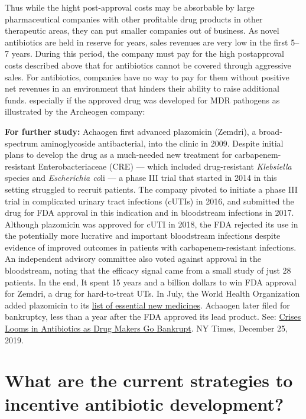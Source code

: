 \documentclass[
]{book}
\begin{document}
Thus while the hight post-approval costs may be absorbable by large pharmaceutical companies with other profitable drug products in other therapeutic areas, they can put smaller companies out of business. As novel antibiotics are held in reserve for years, sales revenues are very low in the first 5--7 years. During this period, the company must pay for the high postapproval costs described above that for antibiotics cannot be covered through aggressive sales. For antibiotics, companies have no way to pay for them without positive net revenues in an environment that hinders their ability to raise additional funds. especially if the approved drug was developed for MDR pathogens as illustrated by the Archeogen company:

\textbf{For further study:} Achaogen first advanced plazomicin (Zemdri), a broad-spectrum aminoglycoside antibacterial, into the clinic in 2009. Despite initial plans to develop the drug as a much-needed new treatment for carbapenem-resistant Enterobacteriaceae (CRE) --- which included drug-resistant \emph{Klebsiella} species and \emph{Escherichia co}li --- a phase III trial that started in 2014 in this setting struggled to recruit patients. The company pivoted to initiate a phase III trial in complicated urinary tract infections (cUTIs) in 2016, and submitted the drug for FDA approval in this indication and in bloodstream infections in 2017. Although plazomicin was approved for cUTI in 2018, the FDA rejected its use in the potentially more lucrative and important bloodstream infections despite evidence of improved outcomes in patients with carbapenem-resistant infections. An independent advisory committee also voted against approval in the bloodstream, noting that the efficacy signal came from a small study of just 28 patients. In the end, It spent 15 years and a billion dollars to win FDA approval for Zemdri, a drug for hard-to-treat UTs. In July, the World Health Organization added plazomicin to its \href{https://www.who.int/medicines/publications/essentialmedicines/en/}{list of essential new medicines}. Achaogen later filed for bankruptcy, less than a year after the FDA approved its lead product. See: \href{https://www.nytimes.com/2019/12/25/health/antibiotics-new-resistance.html}{Crises Looms in Antibiotics as Drug Makers Go Bankrupt}. NY Times, December 25, 2019.

\hypertarget{what-are-the-current-strategies-to-incentive-antibiotic-development}{%
\section*{What are the current strategies to incentive antibiotic development?}\label{what-are-the-current-strategies-to-incentive-antibiotic-development}}
\end{document}
